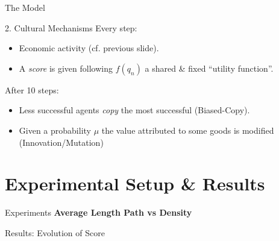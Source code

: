\documentclass[12pt, handout=show,notes=show]{beamer}
\begin{document}
\begin{frame}{The Model}
	\begin{block}{2. Cultural Mechanisms}
	    Every step:
	    \begin{itemize}
		    \item Economic activity (cf. previous slide).
		    \item A \emph{score} is given following $f(q_n)$  a shared \& fixed ``utility function''.
	    \end{itemize}
		After 10 steps:
		\begin{itemize}
		    \item Less successful agents \emph{copy} the most successful (Biased-Copy).
		    \item Given a probability $\mu$ the value attributed to some goods is modified (Innovation/Mutation)
		\end{itemize}
	\end{block}
\end{frame}

\section{Experimental Setup \& Results}
\begin{frame}{Experiments}
	\centering
	\textbf{Average Length Path vs Density}
	 

\end{frame}



\begin{frame}{Results: }
    Evolution of Score
\end{frame}
    
\end{document}
